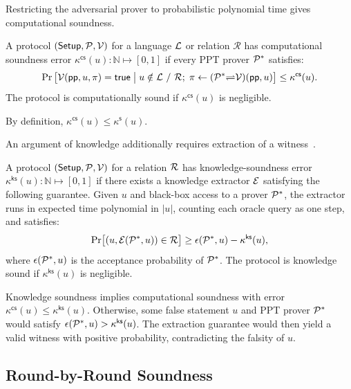 Restricting the adversarial prover to probabilistic polynomial time
gives computational soundness.
\begin{definition}
\label{def:ComputationalSoundness}
A protocol $({\sf Setup},\mathcal{P},\mathcal{V})$ for a language
$\mathcal{L}$ or relation $\mathcal R$ has computational soundness
error $\kappa^\mathsf{cs}(u)\colon\mathbb N\mapsto[0,1]$ if
every PPT prover $\mathcal{P}^*$ satisfies:
\[
    \Pr\left[
        \mathcal{V}({\sf pp},u,\pi)={\sf true}
        \;\middle|\;
        \begin{gathered}
            u\notin\mathcal{L}~/~\mathcal{R};\;
            \pi\leftarrow(\mathcal{P}^*{\rightleftharpoons}\mathcal{V})({\sf pp},u)
        \end{gathered}
    \right]
    \leq\kappa^\mathsf{cs}(u).
\]
The protocol is computationally sound if
$\kappa^\mathsf{cs}(u)$ is negligible.
\end{definition}
By definition, $\kappa^\mathsf{cs}(u)\leq\kappa^\mathsf{s}(u)$.

An argument of knowledge additionally requires extraction of a
witness~\cite{crypto/AttemaCK21}.
\begin{definition}
\label{def:knowledgeSoundness}
A protocol $({\sf Setup},\mathcal{P},\mathcal{V})$ for a relation $\mathcal{R}$
has knowledge-soundness error
$\kappa^\mathsf{ks}(u)\colon\mathbb N\mapsto[0,1]$ if there
exists a knowledge extractor $\mathcal{E}$ satisfying the following
guarantee. Given $u$ and black-box access to a prover $\mathcal{P}^*$,
the extractor runs in expected time polynomial in $|u|$, counting
each oracle query as one step, and satisfies:
\[
    \Pr\bigl[(u,\mathcal{E}(\mathcal{P}^*,u))\in\mathcal{R}\bigr]
    \geq\epsilon(\mathcal{P}^*,u)-\kappa^\mathsf{ks}(u),
\]
where $\epsilon(\mathcal{P}^*,u)$ is the acceptance probability of
$\mathcal{P}^*$. The protocol is knowledge sound if
$\kappa^\mathsf{ks}(u)$ is negligible.
\end{definition}

Knowledge soundness implies computational soundness with error
$\kappa^\mathsf{cs}(u)\leq\kappa^\mathsf{ks}(u)$.
Otherwise, some false statement $u$ and PPT prover $\mathcal{P}^*$ would
satisfy $\epsilon(\mathcal{P}^*,u)>\kappa^\mathsf{ks}(u)$.
The extraction guarantee would then yield a valid witness with
positive probability, contradicting the falsity of $u$.


\subsection{Round-by-Round Soundness}
\label{appx:rbyDef}

